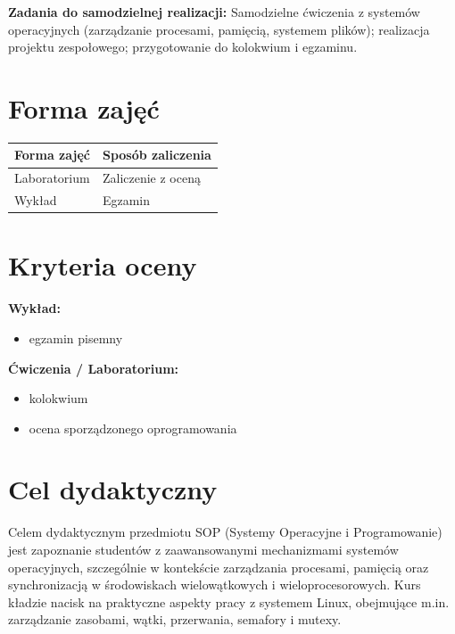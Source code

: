 \documentclass[12pt, a4paper]{article}
\newcommand{\thdrule}{\noalign{\global\setlength{\extrarowheight}{0pt}}}
\newcommand{\thdend}{\noalign{\global\setlength{\extrarowheight}{3pt}}}
\begin{document}
\vspace{4pt}
\noindent\textbf{Zadania do samodzielnej realizacji:} Samodzielne ćwiczenia z systemów operacyjnych (zarządzanie procesami, pamięcią, systemem plików); realizacja projektu zespołowego; przygotowanie do kolokwium i egzaminu.

\section{Forma zajęć}

\begin{center}
{\scriptsize
\begin{tabular}{m{5cm}m{8cm}}
\thdrule\toprule
\rowcolor{pjatkRed} {\color{white}\textbf{Forma zajęć}} & {\color{white}\textbf{Sposób zaliczenia}} \\
\midrule\thdend
  \rowcolor{tableRowLight} Laboratorium & Zaliczenie z oceną \\
  \rowcolor{tableRowAlt} Wykład & Egzamin \\
\bottomrule
\end{tabular}}
\end{center}

\section{Kryteria oceny}

\textbf{Wykład:}
\begin{itemize}
  \item egzamin pisemny
\end{itemize}
\vspace{4pt}
\textbf{Ćwiczenia / Laboratorium:}
\begin{itemize}
  \item kolokwium
  \item ocena sporządzonego oprogramowania
\end{itemize}


\section{Cel dydaktyczny}

Celem dydaktycznym przedmiotu SOP (Systemy Operacyjne i Programowanie) jest zapoznanie studentów z zaawansowanymi mechanizmami systemów operacyjnych, szczególnie w kontekście zarządzania procesami, pamięcią oraz synchronizacją w środowiskach wielowątkowych i wieloprocesorowych. Kurs kładzie nacisk na praktyczne aspekty pracy z systemem Linux, obejmujące m.in. zarządzanie zasobami, wątki, przerwania, semafory i mutexy.
\end{document}
